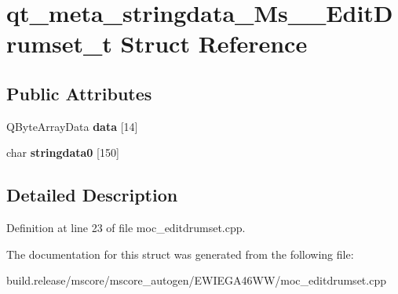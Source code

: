 \hypertarget{structqt__meta__stringdata___ms_____edit_drumset__t}{}\section{qt\+\_\+meta\+\_\+stringdata\+\_\+\+Ms\+\_\+\+\_\+\+Edit\+Drumset\+\_\+t Struct Reference}
\label{structqt__meta__stringdata___ms_____edit_drumset__t}
\subsection*{Public Attributes}
\begin{DoxyCompactItemize}
\item 
\mbox{\label{structqt__meta__stringdata___ms_____edit_drumset__t_ad90c582e8688ba30f08783bc62bc625e}} 
Q\+Byte\+Array\+Data {\bfseries data} \mbox{[}14\mbox{]}
\item 
\mbox{\label{structqt__meta__stringdata___ms_____edit_drumset__t_a4cfd781de7910b3171c068d46f16dfba}} 
char {\bfseries stringdata0} \mbox{[}150\mbox{]}
\end{DoxyCompactItemize}


\subsection{Detailed Description}


Definition at line 23 of file moc\+\_\+editdrumset.\+cpp.



The documentation for this struct was generated from the following file\+:\begin{DoxyCompactItemize}
\item 
build.\+release/mscore/mscore\+\_\+autogen/\+E\+W\+I\+E\+G\+A46\+W\+W/moc\+\_\+editdrumset.\+cpp\end{DoxyCompactItemize}
